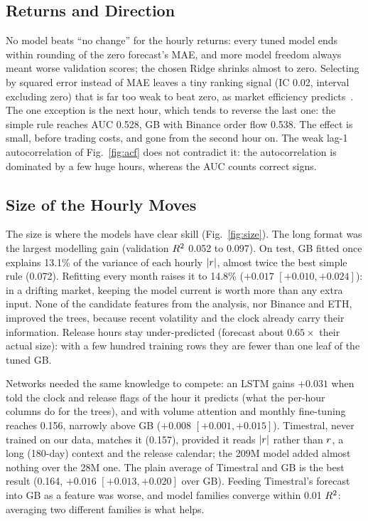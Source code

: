 \subsection{Returns and Direction}
\label{sec:res_returns}
No model beats ``no change'' for the hourly returns: every tuned model
ends within rounding of the zero forecast's MAE, and more model freedom
always meant worse validation scores; the chosen Ridge shrinks almost to
zero. Selecting by squared error instead of MAE leaves a tiny ranking
signal (IC 0.02, interval excluding zero) that is far too weak to beat
zero, as market efficiency predicts~\cite{fama1970}. The one exception
is the next hour, which tends to reverse the last one: the simple rule
reaches AUC 0.528, GB with Binance order flow 0.538. The effect is small,
before trading costs, and gone from the second hour on. The weak lag-1
autocorrelation of Fig.~\ref{fig:acf} does not contradict it: the
autocorrelation is dominated by a few huge hours, whereas the AUC counts
correct signs.

\subsection{Size of the Hourly Moves}
\label{sec:res_size}
The size is where the models have clear skill (Fig.~\ref{fig:size}). The
long format was the largest modelling gain (validation $R^2$ 0.052 to
0.097). On test, GB fitted once explains 13.1\% of the variance of each
hourly $|r|$, almost twice the best simple rule (0.072). Refitting
every month raises it to 14.8\% ($+0.017$ $[+0.010, +0.024]$): in a
drifting market, keeping the model current is worth more than any extra
input. None of the candidate features from the analysis, nor Binance and
ETH, improved the trees, because recent volatility and the clock already
carry their information. Release hours stay under-predicted (forecast
about $0.65\times$ their actual size): with a few hundred training rows
they are fewer than one leaf of the tuned GB.

Networks needed the same knowledge to compete: an LSTM gains $+0.031$
when told the clock and release flags of the hour it predicts (what the
per-hour columns do for the trees), and with volume attention and
monthly fine-tuning reaches 0.156, narrowly above GB ($+0.008$ $[+0.001,
+0.015]$). Timestral, never trained on our data, matches it (0.157),
provided it reads $|r|$
rather than $r$, a long (180-day) context and the release calendar;
the 209M model added almost nothing over the 28M one. The plain average
of Timestral and GB is the best result (0.164, $+0.016$ $[+0.013,
+0.020]$ over GB). Feeding Timestral's forecast into GB as a feature was
worse, and model families converge within 0.01 $R^2$: averaging two
different families is what helps.

